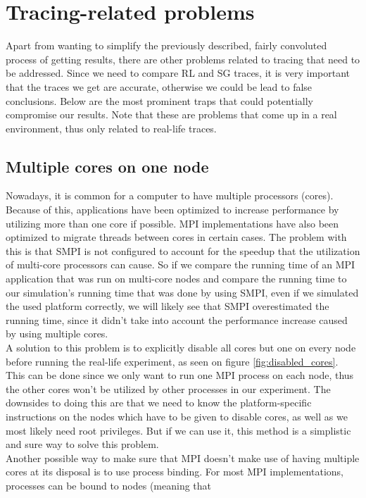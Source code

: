 \section{Tracing-related problems}
Apart from wanting to simplify the previously described, fairly
convoluted process of getting results, there are other problems
related to tracing that need to be addressed. Since we need to compare
RL and SG traces, it is very important that the traces we get are
accurate, otherwise we could be lead to false conclusions. Below are
the most prominent traps that could potentially compromise our
results. Note that these are problems that come up in a real
environment, thus only related to real-life traces.
\subsection{Multiple cores on one node}
Nowadays, it is common for a computer to have multiple processors
(cores). Because of this, applications have been optimized to increase
performance by utilizing more than one core if possible. MPI
implementations have
also been optimized to migrate threads between cores in certain
cases. The problem with this is that SMPI is not configured to account
for the speedup that the utilization of multi-core processors can
cause. So if we compare the running time of an MPI application that
was run on multi-core nodes and compare the running time to our
simulation's running time that was done by using SMPI, even if we
simulated the used platform correctly, we will likely see that SMPI
overestimated the running time, since it didn't take into account the
performance increase caused by using multiple cores.\\
A solution to this problem is to explicitly disable all cores
but one on every node before running the real-life experiment, as seen
on figure \ref{fig:disabled_cores}.\cite{ms11} This can be done since
we only want to run one MPI process on each node, thus the other cores
won't be utilized by other processes in our experiment. The downsides
to doing this are that we need to know the platform-specific
instructions on the nodes which have to be given to disable cores, as
well as we most likely need root privileges. But if we can use it,
this method is a simplistic and sure way to solve this problem.\\
Another possible way to make sure that MPI doesn't make use of having
multiple cores at its disposal is to use process binding. For most MPI
implementations, processes can be bound to nodes (meaning that
